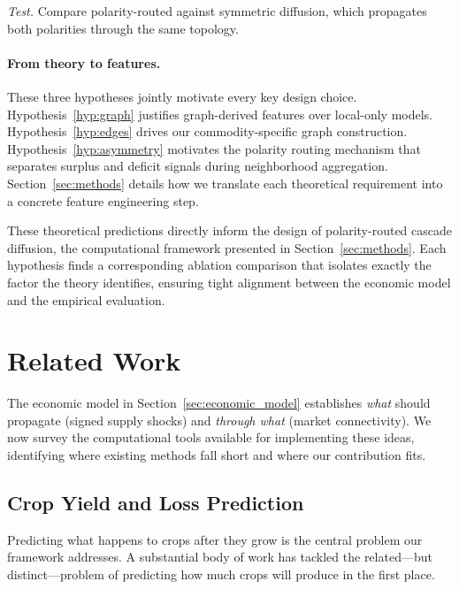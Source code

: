 \documentclass[preprint,12pt,authoryear]{elsarticle}
\begin{document}
\noindent\textit{Test.}\; Compare polarity-routed against symmetric diffusion, which propagates both polarities through the same topology.

\paragraph{From theory to features.}
These three hypotheses jointly motivate every key design choice.
Hypothesis~\ref{hyp:graph} justifies graph-derived features over local-only models.
Hypothesis~\ref{hyp:edges} drives our commodity-specific graph construction.
Hypothesis~\ref{hyp:asymmetry} motivates the polarity routing mechanism that separates surplus and deficit signals during neighborhood aggregation.
Section~\ref{sec:methods} details how we translate each theoretical requirement into a concrete feature engineering step.

These theoretical predictions directly inform the design of polarity-routed cascade diffusion, the computational framework presented in Section~\ref{sec:methods}. Each hypothesis finds a corresponding ablation comparison that isolates exactly the factor the theory identifies, ensuring tight alignment between the economic model and the empirical evaluation.


\section{Related Work}
\label{sec:related_work}

The economic model in Section~\ref{sec:economic_model} establishes \emph{what} should propagate (signed supply shocks) and \emph{through what} (market connectivity). We now survey the computational tools available for implementing these ideas, identifying where existing methods fall short and where our contribution fits.

\subsection{Crop Yield and Loss Prediction}

Predicting what happens to crops after they grow is the central problem our framework addresses. A substantial body of work has tackled the related---but distinct---problem of predicting how much crops will produce in the first place.
\end{document}
